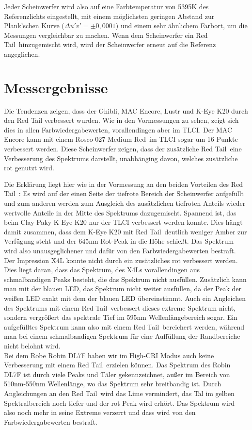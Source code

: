 
Jeder Scheinwerfer wird also auf eine Farbtemperatur von 5395K des Referenzlichts eingestellt, mit einem möglichsten geringen Abstand zur Plank'schen Kurve ($ \Delta u'v'=\pm0,0001$) und einem sehr ähnlichem Farbort, um die Messungen vergleichbar zu machen. Wenn dem Scheinwerfer ein \glqq Red Tail\grqq\ hinzugemischt wird, wird der Scheinwerfer erneut auf die Referenz angeglichen. 


\chapter{Messergebnisse}

Die Tendenzen zeigen, dass der Ghibli, MAC Encore, Lustr und K-Eye K20 durch den Red Tail verbessert wurden. Wie in den Vormessungen zu sehen, zeigt sich dies in allen Farbwiedergabewerten, vorallendingen aber im TLCI. Der MAC Encore kann mit einem Rosco 027 \glqq Medium Red\grqq\ im TLCI sogar um 16 Punkte verbessert werden. Diese Scheinwerfer zeigen, dass der zusätzliche \glqq Red Tail\grqq\ eine Verbesserung des Spektrums darstellt, unabhänging davon, welches zusätzliche rot genutzt wird. 

Die Erklärung liegt hier wie in der Vormessung an den beiden Vorteilen des \glqq Red Tail\grqq\ : Es wird auf der einen Seite der tiefrote Bereich der Scheinwerfer aufgefüllt und zum anderen werden zum Ausgleich des zusätzlichen tiefroten Anteils wieder wertvolle Anteile in der Mitte des Spektrums dazugemischt. Spannend ist, das beim Clay Paky K-Eye K20 nur der TLCI verbessert werden konnte. Dies hängt damit zusammen, dass dem K-Eye K20 mit \glqq Red Tail\grqq\ deutlich weniger Amber zur Verfügung steht und der 645nm Rot-Peak in die Höhe schießt. Das Spektrum wird also unausgeglichener und dafür von den Farbwiedergabewerten bestraft.\\
Der Impression X4L konnte nicht durch ein zusätzliches rot verbessert werden. Dies liegt daran, dass das Spektrum, des X4Ls vorallendingen aus schmalbandigen Peaks besteht, die das Spektrum nicht ausfüllen. Zusätzlich kann man mit der blauen LED, das Spektrum nicht weiter ausfüllen, da der Peak der weißen LED exakt mit dem der blauen LED übereinstimmt. Auch ein Angleichen des Spektrums mit einem \glqq Red Tail\grqq\ verbessert dieses extreme Spektrum nicht, sondern vergrößert das spektrale Tief im 595nm Wellenlängebereich sogar. Ein aufgefülltes Spektrum kann also mit einem \glqq Red Tail\grqq\ bereichert werden, während man bei einem schmalbandigen Spektrum für eine Auffüllung der Randbereiche nicht belohnt wird.\\
Bei dem Robe Robin DL7F haben wir im High-CRI Modus auch keine Verbesserung mit einem \glqq Red Tail\grqq\ erzielen können. Das Spektrum des Robin DL7F ist durch viele Peaks und Täler gekennzeichnet, außer im Bereich von 510nm-550nm Wellenlänge, wo das Spektrum sehr breitbandig ist. Durch Angleichungen an den \glqq Red Tail\grqq\ wird das Lime vermindert, das Tal im gelben Spektralbereich noch tiefer und der rot Peak wird erhört. Das Spektrum wird also noch mehr in seine Extreme verzerrt und dass wird von den Farbwiedergabewerten bestraft.

